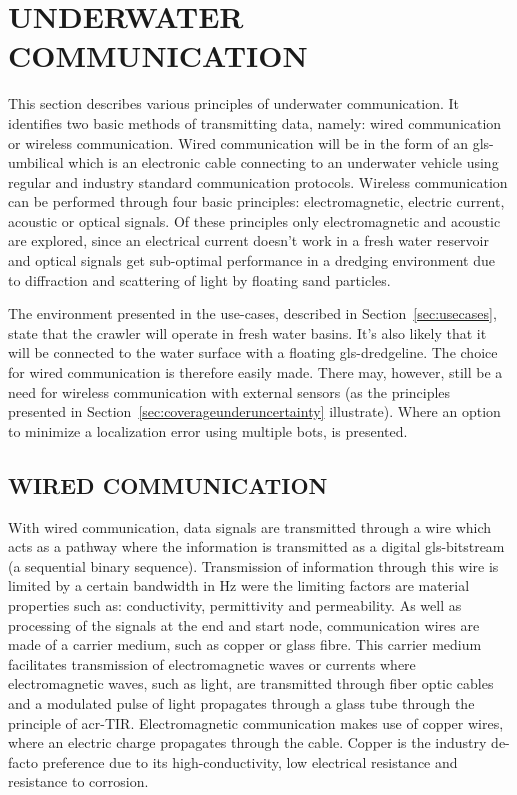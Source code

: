 

\section{UNDERWATER COMMUNICATION}\label{sec:underwater_communication}
This section describes various principles of underwater communication. It identifies two basic methods of
transmitting data, namely: wired communication or wireless communication. Wired communication will be in the form of
an \gls{gls-umbilical} which is an electronic cable connecting to an underwater vehicle using regular and industry
standard communication protocols. Wireless communication can be performed through four basic principles:
electromagnetic, electric current, acoustic or optical signals. Of these principles only electromagnetic and acoustic
are explored, since an electrical current doesn't work in a fresh water reservoir and optical signals get sub-optimal
performance in a dredging environment due to diffraction and scattering of light by floating sand particles.

The environment presented in the use-cases, described in Section~\ref{sec:usecases}, state that the crawler will 
operate in fresh water basins. It's also likely that it will be connected to the water surface with a floating 
\gls{gls-dredgeline}. The choice for wired communication is therefore easily made. There may, however, still be a 
need for wireless communication with external sensors (as the principles presented in 
Section~\ref{sec:coverageunderuncertainty} illustrate). Where an option to minimize a localization error using 
multiple bots, is presented.

\subsection{WIRED COMMUNICATION}\label{sec:wired communication}
With wired communication, data signals are transmitted through a wire which acts as a pathway where the information 
is transmitted as a digital \gls{gls-bitstream} (a sequential binary sequence). Transmission of information through 
this wire is limited by a certain bandwidth in \si{\hertz} were the limiting factors are material properties such as:
conductivity, permittivity and permeability. As well as processing of the signals at the end and start node, 
communication wires are made of a carrier medium, such as copper or glass fibre. This carrier medium facilitates 
transmission of electromagnetic waves or currents where electromagnetic waves, such as light, are transmitted through
fiber optic cables and a modulated pulse of light propagates through a glass tube through the principle of 
\gls{acr-TIR}. Electromagnetic communication makes use of copper wires, where an electric charge propagates through 
the cable. Copper is the industry de-facto preference due to its high-conductivity, low electrical resistance and 
resistance to corrosion.


